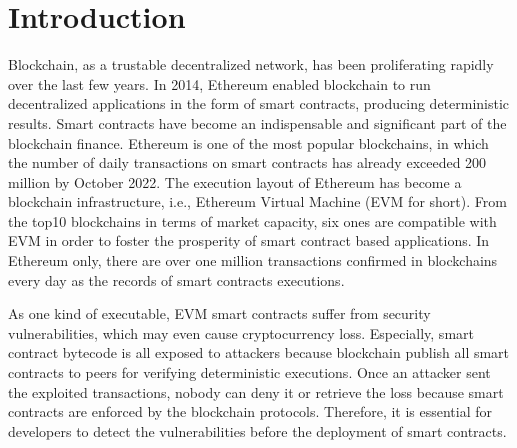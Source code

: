 \section{Introduction}
Blockchain, as a trustable decentralized network, has been proliferating rapidly over the last few years. 
In 2014, Ethereum\cite{wood2014ethereum} enabled blockchain to run decentralized applications in the form of smart contracts, producing deterministic results. %
Smart contracts have become an indispensable and significant part of the blockchain finance.
%
Ethereum is one of the most popular blockchains, in which the number of daily transactions on smart contracts has already exceeded 200 million by October 2022\cite{etherscan}.  
The execution layout of Ethereum has become a blockchain infrastructure, i.e., Ethereum Virtual Machine (EVM for short).
From the top10 blockchains in terms of market capacity, six ones are compatible with EVM in order to foster the prosperity of smart contract based applications\cite{coinmarketcap}.  
In Ethereum only, there are over one million transactions confirmed in blockchains every day as the records of smart contracts executions\cite{etherscan}.  

As one kind of executable, EVM smart contracts suffer from security vulnerabilities, which may even cause cryptocurrency loss\cite{ethtract,smartcontractsurvey,defects}. 
Especially, smart contract bytecode is all exposed to attackers because blockchain publish all smart contracts to peers for verifying deterministic executions.
Once an attacker sent the exploited transactions, nobody can deny it or retrieve the loss because smart contracts are enforced by the blockchain protocols. Therefore, it is essential for developers to detect the vulnerabilities before the deployment of smart contracts.

